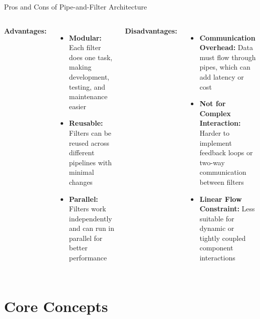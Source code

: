 \documentclass[aspectratio=169, table]{beamer}
\begin{document}
\begin{frame}[fragile]{Pros and Cons of Pipe-and-Filter Architecture}
	\vspace{20pt}
	\begin{columns}[T]
		\textbf{Advantages:}
		\begin{itemize}
			\item \textbf{Modular:} Each filter does one task, making development, testing, and maintenance easier
			\item \textbf{Reusable:} Filters can be reused across different pipelines with minimal changes
			\item \textbf{Parallel:} Filters work independently and can run in parallel for better performance
		\end{itemize}
		
		\textbf{Disadvantages:}
		\begin{itemize}
			\item \textbf{Communication Overhead:} Data must flow through pipes, which can add latency or cost
			\item \textbf{Not for Complex Interaction:} Harder to implement feedback loops or two-way communication between filters
			\item \textbf{Linear Flow Constraint:} Less suitable for dynamic or tightly coupled component interactions
		\end{itemize}
	\end{columns}
\end{frame}

\section{Core Concepts}
\end{document}
